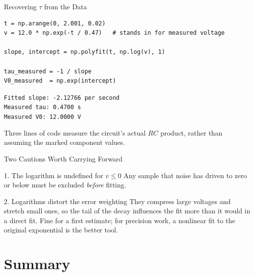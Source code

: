 \documentclass[9pt,aspectratio=169,xcolor=table]{beamer}
\begin{document}
\begin{frame}[fragile]{Recovering $\tau$ from the Data}
    \leavevmode
\begin{lstlisting}
t = np.arange(0, 2.001, 0.02)
v = 12.0 * np.exp(-t / 0.47)   # stands in for measured voltage

slope, intercept = np.polyfit(t, np.log(v), 1)

tau_measured = -1 / slope
V0_measured  = np.exp(intercept)
\end{lstlisting}

    \vspace{1mm}
    \texttt{Fitted slope:  -2.12766 per second}\\
    \texttt{Measured tau:  0.4700 s}\\
    \texttt{Measured V0:   12.0000 V}

    \vspace{2mm}
    \small Three lines of code measure the circuit's \alert{actual}
    $RC$ product, rather than assuming the marked component values.
\end{frame}

\begin{frame}{Two Cautions Worth Carrying Forward}
    \leavevmode
    \begin{block}{1. The logarithm is undefined for $v \le 0$}
        \small Any sample that noise has driven to zero or below must be
        excluded \emph{before} fitting.
    \end{block}

    \vspace{3mm}
    \begin{block}{2. Logarithms distort the error weighting}
        \small They compress large voltages and stretch small ones, so
        the tail of the decay influences the fit more than it would in a
        direct fit. Fine for a first estimate; for precision work, a
        nonlinear fit to the original exponential is the better tool.
    \end{block}
\end{frame}

\section{Summary}
\end{document}
